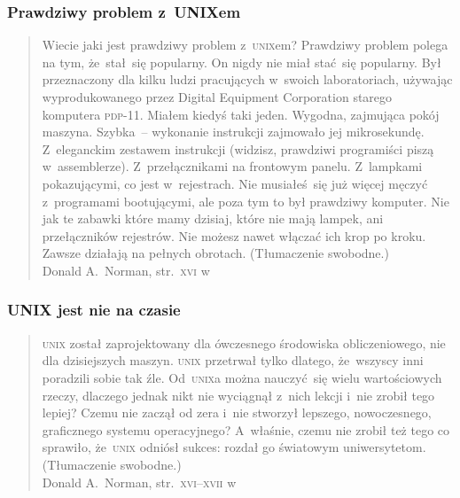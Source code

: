\documentclass[10pt,t]{beamer}
\begin{document}
\begin{frame}
  \frametitle{Prawdziwy problem z~UNIXem}


  \begin{quote}

    Wiecie jaki jest prawdziwy problem z~\textsc{unix}em? Prawdziwy problem
    polega na tym, że~stał~się popularny. On nigdy nie miał stać~się
    popularny. Był przeznaczony dla kilku ludzi pracujących w~swoich
    laboratoriach, używając wyprodukowanego przez Digital Equipment
    Corporation starego
    komputera \textsc{pdp}-11. Miałem kiedyś taki jeden. Wygodna, zajmująca
    pokój maszyna. Szybka~-- wykonanie instrukcji zajmowało jej mikrosekundę.
    Z~eleganckim zestawem instrukcji (widzisz, prawdziwi programiści piszą
    w~assemblerze). Z~przełącznikami na frontowym panelu. Z~lampkami
    pokazującymi, co jest w~rejestrach. Nie musiałeś~się już więcej męczyć
    z~programami bootującymi, ale poza tym to był prawdziwy komputer. Nie
    jak te zabawki które mamy dzisiaj, które nie mają lampek, ani
    przełączników rejestrów. Nie możesz nawet włączać ich krop po kroku.
    Zawsze działają na pełnych obrotach. (Tłumaczenie swobodne.) \\
    Donald A.~Norman, str.~\textsc{xvi}
    w~\parencite{Garfinkel-Weise-Strassmann-The-UNIX-HATERS-Handbook-Pub-1994}

  \end{quote}

\end{frame}





\begin{frame}
  \frametitle{UNIX jest nie na czasie}


  \begin{quote}

    \textsc{unix} został zaprojektowany dla ówczesnego środowiska
    obliczeniowego, nie dla dzisiejszych maszyn. \textsc{unix} przetrwał
    tylko dlatego, że~wszyscy inni poradzili sobie tak źle.
    Od~\textsc{unix}a można nauczyć~się wielu wartościowych rzeczy,
    dlaczego jednak nikt nie wyciągnął z~nich lekcji i~nie zrobił
    tego lepiej? Czemu nie zaczął od zera i~nie stworzył lepszego,
    nowoczesnego, graficznego systemu operacyjnego? A~właśnie, czemu nie
    zrobił też tego co sprawiło, że~\textsc{unix} odniósł sukces: rozdał go
    światowym uniwersytetom. (Tłumaczenie swobodne.) \\
    Donald A.~Norman, str.~\textsc{xvi}--\textsc{xvii}
    w~\parencite{Garfinkel-Weise-Strassmann-The-UNIX-HATERS-Handbook-Pub-1994}

  \end{quote}

\end{frame}
\end{document}
